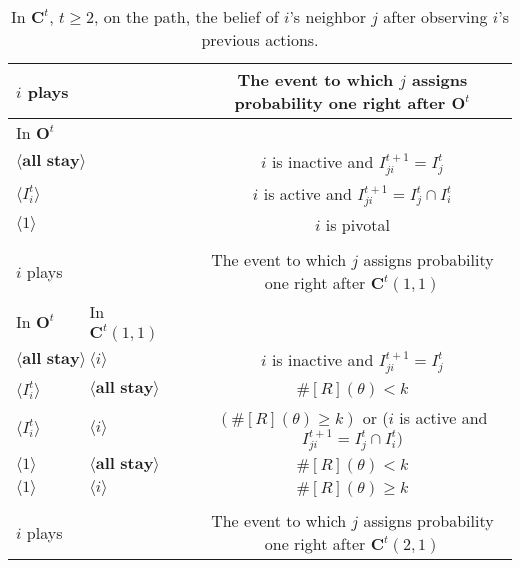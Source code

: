 \documentclass[12pt,letter]{article}
\newcommand{\Kappa}{\mathbf{C}}
\newcommand{\Omicron}{\mathbf{O}}
\theoremstyle{definition}
\theoremstyle{remark}
\theoremstyle{claim}
\begin{document}
\begin{table}[!htbp]
\caption{In $\Kappa^t$, $t\geq 2$, on the path, the belief of $i$'s neighbor $j$ after observing $i$'s previous actions.}
\label{Table_blf_cdt}
\begin{center}
\begin{tabular}{l l l | c}
 $i$ plays  	&&	&	 The event to which $j$ assigns probability one right after $\Omicron^t$\\
\hline
\hline
 In $\Omicron^t$		&&&					 \\
\hline
$\langle \textbf{all stay} \rangle$  &&&     $i$ is inactive and $I^{t+1}_{ji}=I^t_j$ \\
$\langle I^t_{i} \rangle$  &&&     $i$ is active and $I^{t+1}_{ji}=I^t_j\cap I^t_{i}$ \\
$\langle 1 \rangle$  &&& 	  $i$ is pivotal    \\
\hline
\\
 $i$ plays	&&			  & The event to which $j$ assigns probability one right after $\Kappa^t(1,1)$\\
\hline
\hline
	  In $\Omicron^t$	 	&		In $\Kappa^t(1,1)$	&		&		  \\
\hline
$\langle \textbf{all stay} \rangle$  & $\langle i \rangle$	&&    $i$ is inactive and $I^{t+1}_{ji}=I^t_j$  \\
$\langle I^t_{i} \rangle$  & $\langle \textbf{all stay} \rangle$	&&    $\#[R](\theta)< k$ \\
$\langle I^t_{i} \rangle$  & $\langle i \rangle$	&&   $(\#[R](\theta)\geq k )$ or  ($i$ is active and $I^{t+1}_{ji}=I^t_j\cap I^t_{i})$\\
$\langle 1 \rangle$  & $\langle \textbf{all stay} \rangle$	&&	  $\#[R](\theta)< k$    \\
$\langle 1 \rangle$  & $\langle i \rangle$	&&	  $\#[R](\theta)\geq k$  \\
\hline
\\
 $i$ plays  	&		&  	  &The event to which $j$ assigns probability one right after $\Kappa^t(2,1)$\\

\end{tabular}
\end{center}
\end{table}
\end{document}
